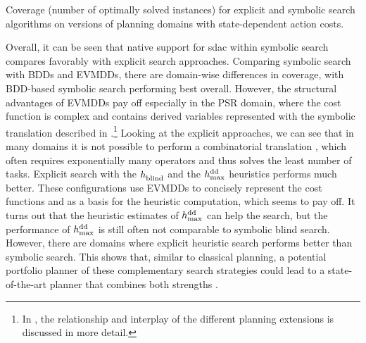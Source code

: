 \begin{table}
    \begin{center}
        \resizebox{1\textwidth}{!}{
            
        }
    \end{center}
    \caption[Coverage for planning with state-dependent action costs.]{Coverage (number of optimally solved instances) for explicit and symbolic search algorithms on versions of planning domains with state-dependent action costs.}
    \label{tab:coverage_sdac}
\end{table}

\bigskip
Overall, it can be seen that native support for sdac within symbolic search compares favorably with explicit search approaches.
Comparing symbolic search with BDDs and EVMDDs, there are domain-wise differences in coverage, with BDD-based symbolic search performing best overall.
However, the structural advantages of EVMDDs pay off especially in the PSR domain, where the cost function is complex and contains derived variables represented with the symbolic translation described in .\footnote{In , the relationship and interplay of the different planning extensions is discussed in more detail.} Looking at the explicit approaches, we can see that in many domains it is not possible to perform a combinatorial translation , which often requires exponentially many operators and thus solves the least number of tasks.
Explicit \astar{} search with the $h_\text{\scriptsize{blind}}^\text{\scriptsize{}}$ and the $h_\text{\scriptsize{max}}^\text{\scriptsize{dd}}$ heuristics performs much better.
These configurations use EVMDDs to concisely represent the cost functions and as a basis for the heuristic computation, which seems to pay off.
It turns out that the heuristic estimates of $h_\text{\scriptsize{max}}^\text{\scriptsize{dd}}$ can help the search, but the performance of $h_\text{\scriptsize{max}}^\text{\scriptsize{dd}}$ is still often not comparable to symbolic blind search.
However, there are domains where explicit heuristic search performs better than symbolic search. This shows that, similar to classical planning, a potential portfolio planner of these complementary search strategies could lead to a state-of-the-art planner that combines both strengths \autocite{sievers-et-al-aaai2019}.



